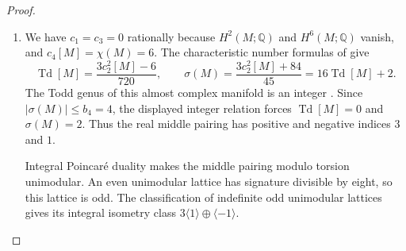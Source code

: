 \begin{proof}
\begin{enumerate}[label={$\langle1\rangle$\arabic*.}]
Over the two-dimensional pair of pants the prescribed boundary
sections of the associated $\mathcal J$-bundle extend over relative
one-cells by connectedness and over relative two-cells by simple
connectivity. Smooth approximation relative to the collars gives
a smooth vertical structure. Horizontal splittings form an affine
space, so a partition of unity extends the prescribed complex
splittings from those collars. Combining the vertical structure with
the pulled-back base structure and gluing the caps gives the required
almost complex structure on $M$.

\item We have $c_1=c_3=0$ rationally because $H^2(M;\mathbb Q)$ and
$H^6(M;\mathbb Q)$ vanish, and $c_4[M]=\chi(M)=6$. The characteristic
number formulas of \cite[equations (1.2)--(1.4), pp.~3--4]{ffEsoleKang} give
\[
 \operatorname{Td}[M]=\frac{3c_2^2[M]-6}{720},
 \qquad
 \sigma(M)=\frac{3c_2^2[M]+84}{45}
           =16\operatorname{Td}[M]+2.
\]
The Todd genus of this almost complex manifold is an integer
\cite[Theorem 24.5.4 and corollary, p.~184]{HirzebruchTopologicalMethods}.
Since $|\sigma(M)|\leq b_4=4$, the displayed integer relation forces
$\operatorname{Td}[M]=0$ and $\sigma(M)=2$. Thus the real middle
pairing has positive and negative indices $3$ and $1$.

Integral Poincar\'e duality makes the middle pairing modulo torsion
unimodular. An even unimodular lattice has signature divisible by
eight, so this lattice is odd. The classification of indefinite odd
unimodular lattices
\cite[Theorem 2.2.1, p.~61]{ffPetersSterk} gives its integral isometry
class $3\langle1\rangle\oplus\langle-1\rangle$.
\end{enumerate}
\end{proof}


